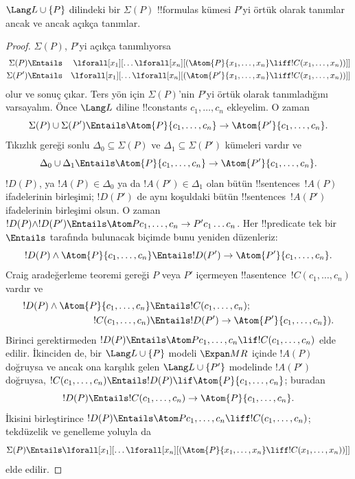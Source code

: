 \documentclass[../../../include/open-logic-section]{subfiles}
\begin{document}
\begin{thm}
$\Lang L\cup\{P\}$ dilindeki bir $\Sigma(P)$ !!{formula}s kümesi
$P$'yi örtük olarak tanımlar ancak ve ancak açıkça tanımlar.
\end{thm}

\begin{proof}
$\Sigma(P)$, $P$'yi açıkça tanımlıyorsa
\begin{align*}
  \Sigma(P) & \Entails & \lforall[x_1][\dots \lforall[x_n]
    [(\Atom{P}{x_1,\dots, x_n} \liff !C(x_1,\dots,x_n))]]\\
  \Sigma(P') & \Entails & \lforall[x_1][\dots \lforall[x_n]
    [(\Atom{P'}{x_1,\dots, x_n} \liff !C(x_1,\dots,x_n))]]
\end{align*}
olur ve sonuç çıkar. Ters yön için $\Sigma(P)$'nin $P$'yi örtük olarak
tanımladığını varsayalım. Önce $\Lang L$ diline !!{constant}s
$c_1,\dots,c_n$ ekleyelim. O zaman
\[
\Sigma(P) \cup \Sigma(P') \Entails
\Atom{P}{c_1, \dots, c_n} \to \Atom{P'}{c_1, \dots, c_n}.
\]
Tıkızlık gereği sonlu $\Delta_0\subseteq\Sigma(P)$ ve
$\Delta_1\subseteq\Sigma(P')$ kümeleri vardır ve
\[
\Delta_0 \cup \Delta_1 \Entails
\Atom{P}{c_1, \dots, c_n} \to \Atom{P'}{c_1, \dots, c_n}.
\]
$!D(P)$, ya $!A(P)\in\Delta_0$ ya da $!A(P')\in\Delta_1$ olan bütün
!!{sentence}s~$!A(P)$ ifadelerinin birleşimi; $!D(P')$ de aynı
koşuldaki bütün !!{sentence}s~$!A(P')$ ifadelerinin birleşimi olsun.
O zaman
$!D(P)\land !D(P')\Entails
\Atom P{c_1,\dots,c_n}\to P'c_1\dots c_n$. Her !!{predicate}
tek bir $\Entails$ tarafında bulunacak biçimde bunu yeniden düzenleriz:
\[
!D(P) \land \Atom{P}{c_1, \dots, c_n} \Entails
!D(P') \to \Atom{P'}{c_1, \dots, c_n}.
\]
Craig aradeğerleme teoremi gereği $P$ veya $P'$ içermeyen
!!a{sentence}~$!C(c_1,\dots,c_n)$ vardır ve
\begin{align*}
  !D(P) \land \Atom{P}{c_1, \dots, c_n}
    & \Entails !C(c_1,\dots, c_n); \\
  !C(c_1,\dots, c_n)
    & \Entails !D(P') \to \Atom{P'}{c_1, \dots, c_n}).
\end{align*}
Birinci gerektirmeden
$!D(P)\Entails\Atom P{c_1,\dots,c_n}\lif !C(c_1,\dots,c_n)$ elde
edilir. İkinciden de, bir $\Lang L\cup\{P\}$ modeli
$\Expan M R$ içinde $!A(P)$ doğruysa ve ancak ona karşılık gelen
$\Lang L\cup\{P'\}$ modelinde $!A(P')$ doğruysa,
$!C(c_1,\dots,c_n)\Entails
!D(P)\lif\Atom{P}{c_1,\dots,c_n}$; buradan
\[
!D(P) \Entails !C(c_1,\dots,c_n) \to \Atom{P}{c_1,\dots, c_n}.
\]
İkisini birleştirince
$!D(P)\Entails\Atom P{c_1,\dots,c_n}\liff !C(c_1,\dots,c_n)$; tekdüzelik
ve genelleme yoluyla da
\[
\Sigma(P) \Entails
\lforall[x_1][\dots\lforall[x_n][(\Atom{P}{x_1,\dots, x_n} \liff
    !C(x_1,\dots, x_n))]]
\]
elde edilir.
\end{proof}
\end{document}
